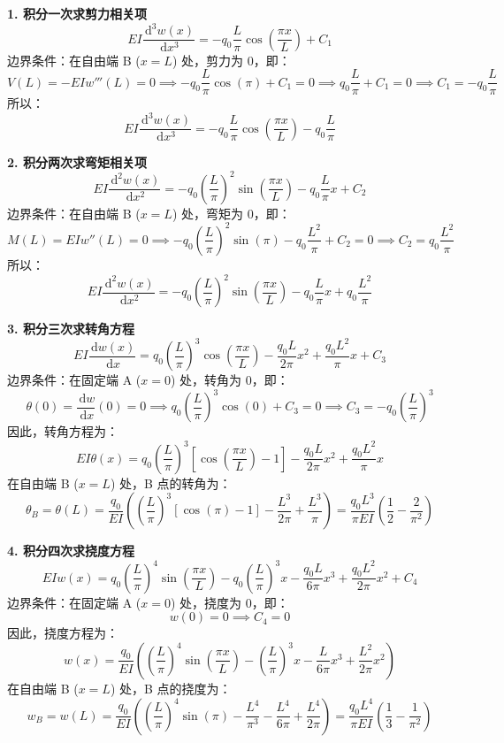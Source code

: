 \documentclass[11pt,a4paper]{ctexrep}
\newcommand{\diff}{\,\mathrm{d}}
\begin{document}
{\textbf{1. 积分一次求剪力相关项}
\[
    EI \frac{\diff^3 w(x)}{\diff x^3} = -q_0 \frac{L}{\pi} \cos\left(\frac{\pi x}{L}\right) + C_1
\]
边界条件：在自由端 B ($x = L$) 处，剪力为 0，即：
\[
    V(L) = -EI w'''(L) = 0 \implies -q_0 \frac{L}{\pi} \cos(\pi) + C_1 = 0 \implies q_0 \frac{L}{\pi} + C_1 = 0 \implies C_1 = -q_0 \frac{L}{\pi}
\]
所以：
\[
    EI \frac{\diff^3 w(x)}{\diff x^3} = -q_0 \frac{L}{\pi} \cos\left(\frac{\pi x}{L}\right) - q_0 \frac{L}{\pi}
\]

\textbf{2. 积分两次求弯矩相关项}
\[
    EI \frac{\diff^2 w(x)}{\diff x^2} = -q_0 \left(\frac{L}{\pi}\right)^2 \sin\left(\frac{\pi x}{L}\right) - q_0 \frac{L}{\pi} x + C_2
\]
边界条件：在自由端 B ($x = L$) 处，弯矩为 0，即：
\[
    M(L) = EI w''(L) = 0 \implies -q_0 \left(\frac{L}{\pi}\right)^2 \sin(\pi) - q_0 \frac{L^2}{\pi} + C_2 = 0 \implies C_2 = q_0 \frac{L^2}{\pi}
\]
所以：
\[
    EI \frac{\diff^2 w(x)}{\diff x^2} = -q_0 \left(\frac{L}{\pi}\right)^2 \sin\left(\frac{\pi x}{L}\right) - q_0 \frac{L}{\pi} x + q_0 \frac{L^2}{\pi}
\]

\textbf{3. 积分三次求转角方程}
\[
    EI \frac{\diff w(x)}{\diff x} = q_0 \left(\frac{L}{\pi}\right)^3 \cos\left(\frac{\pi x}{L}\right) - \frac{q_0 L}{2\pi} x^2 + \frac{q_0 L^2}{\pi} x + C_3
\]
边界条件：在固定端 A ($x = 0$) 处，转角为 0，即：
\[
    \theta(0) = \frac{\diff w}{\diff x}(0) = 0 \implies q_0 \left(\frac{L}{\pi}\right)^3 \cos(0) + C_3 = 0 \implies C_3 = -q_0 \left(\frac{L}{\pi}\right)^3
\]
因此，转角方程为：
\[
    EI \theta(x) = q_0 \left(\frac{L}{\pi}\right)^3 \left[\cos\left(\frac{\pi x}{L}\right) - 1\right] - \frac{q_0 L}{2\pi} x^2 + \frac{q_0 L^2}{\pi} x
\]
在自由端 B ($x = L$) 处，B 点的转角为：
\[
    \theta_B = \theta(L) = \frac{q_0}{EI} \left( \left(\frac{L}{\pi}\right)^3 [\cos(\pi) - 1] - \frac{L^3}{2\pi} + \frac{L^3}{\pi} \right) = \frac{q_0 L^3}{\pi EI} \left( \frac{1}{2} - \frac{2}{\pi^2} \right)
\]

\textbf{4. 积分四次求挠度方程}
\[
    EI w(x) = q_0 \left(\frac{L}{\pi}\right)^4 \sin\left(\frac{\pi x}{L}\right) - q_0 \left(\frac{L}{\pi}\right)^3 x - \frac{q_0 L}{6\pi} x^3 + \frac{q_0 L^2}{2\pi} x^2 + C_4
\]
边界条件：在固定端 A ($x = 0$) 处，挠度为 0，即：
\[
    w(0) = 0 \implies C_4 = 0
\]
因此，挠度方程为：
\[
    w(x) = \frac{q_0}{EI} \left( \left(\frac{L}{\pi}\right)^4 \sin\left(\frac{\pi x}{L}\right) - \left(\frac{L}{\pi}\right)^3 x - \frac{L}{6\pi} x^3 + \frac{L^2}{2\pi} x^2 \right)
\]
在自由端 B ($x = L$) 处，B 点的挠度为：
\[
    w_B = w(L) = \frac{q_0}{EI} \left( \left(\frac{L}{\pi}\right)^4 \sin(\pi) - \frac{L^4}{\pi^3} - \frac{L^4}{6\pi} + \frac{L^4}{2\pi} \right) = \frac{q_0 L^4}{\pi EI} \left( \frac{1}{3} - \frac{1}{\pi^2} \right)
\]

}
\end{document}
